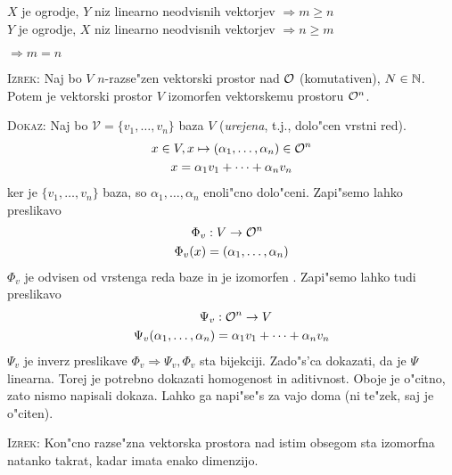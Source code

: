 $X$ je ogrodje, $Y$ niz linearno neodvisnih vektorjev $\Rightarrow m \geq n$\\
$Y$ je ogrodje, $X$ niz linearno neodvisnih vektorjev $\Rightarrow n \geq m$ 

$\Rightarrow m = n$

\textsc{Izrek:} Naj bo $V$ $n$-razse"zen vektorski prostor nad $\mathcal{O}$ (komutativen), $N \in \mathbb{N}$. Potem je vektorski prostor $V$ izomorfen vektorskemu prostoru $\mathcal{O}^n$.

\textsc{Dokaz:} Naj bo $\mathcal{V} = \{v_1, \ldots, v_n\}$ baza $V$ (\emph{urejena}, t.j., dolo"cen vrstni red).
\begin{gather*}
x \in V, x \mapsto (\alpha_1, \ldots, \alpha_n) \in \mathcal{O}^n \\
x = \alpha_1 v_1 + \cdots + \alpha_n v_n
\end{gather*}
ker je $\{v_1, \ldots, v_n\}$ baza, so $\alpha_1, \ldots, \alpha_n$ enoli"cno dolo"ceni. Zapi"semo lahko preslikavo
\begin{align*}
\Phi_v&: V \to \mathcal{O}^n \\
\Phi_v (x) &= (\alpha_1, \ldots, \alpha_n)
\end{align*}
$\Phi_v$ je odvisen od vrstenga reda baze in je izomorfen . Zapi"semo lahko tudi preslikavo
\begin{align*}
\Psi_v&: \mathcal{O}^n \to V \\
\Psi_v (\alpha_1, \ldots, \alpha_n) &= \alpha_1 v_1 + \cdots + \alpha_n v_n
\end{align*}
$\Psi_v$ je inverz preslikave $\Phi_v \Rightarrow \Psi_v, \Phi_v$ sta bijekciji. Zado"s'ca dokazati, da je $\Psi$ linearna. Torej je potrebno dokazati homogenost in aditivnost. Oboje je o"citno, zato nismo napisali dokaza. Lahko ga napi"se"s za vajo doma (ni te"zek, saj je o"citen).

\textsc{Izrek:} Kon"cno razse"zna vektorska prostora nad istim obsegom sta izomorfna natanko takrat, kadar imata enako dimenzijo.

